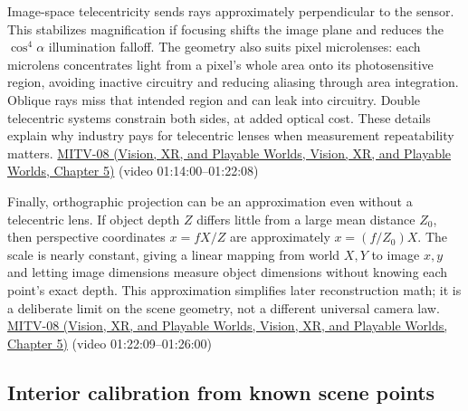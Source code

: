 Image-space telecentricity sends rays approximately perpendicular to the sensor. This stabilizes magnification if focusing shifts the image plane and reduces the \(\cos^4\alpha\) illumination falloff. The geometry also suits pixel microlenses: each microlens concentrates light from a pixel's whole area onto its photosensitive region, avoiding inactive circuitry and reducing aliasing through area integration. Oblique rays miss that intended region and can leak into circuitry. Double telecentric systems constrain both sides, at added optical cost. These details explain why industry pays for telecentric lenses when measurement repeatability matters. \href{../07-Vision-XR-and-Playable-Worlds/main.pdf\#nameddest=04-visual-computing-ii-ch036-mitv-08---shading-special-cases-lunar-surface-scanning-electron-microscope-greens-theorem}{MITV-08 (Vision, XR, and Playable Worlds, Vision, XR, and Playable Worlds, Chapter 5)} (video 01:14:00--01:22:08)

Finally, orthographic projection can be an approximation even without a telecentric lens. If object depth \(Z\) differs little from a large mean distance \(Z_0\), then perspective coordinates \(x=fX/Z\) are approximately \(x=(f/Z_0)X\). The scale is nearly constant, giving a linear mapping from world \(X,Y\) to image \(x,y\) and letting image dimensions measure object dimensions without knowing each point's exact depth. This approximation simplifies later reconstruction math; it is a deliberate limit on the scene geometry, not a different universal camera law. \href{../07-Vision-XR-and-Playable-Worlds/main.pdf\#nameddest=04-visual-computing-ii-ch036-mitv-08---shading-special-cases-lunar-surface-scanning-electron-microscope-greens-theorem}{MITV-08 (Vision, XR, and Playable Worlds, Vision, XR, and Playable Worlds, Chapter 5)} (video 01:22:09--01:26:00)

\subsection{Interior calibration from known scene points}\label{03-visual-computing-i-ch003-interior-calibration-from-known-scene-points}

